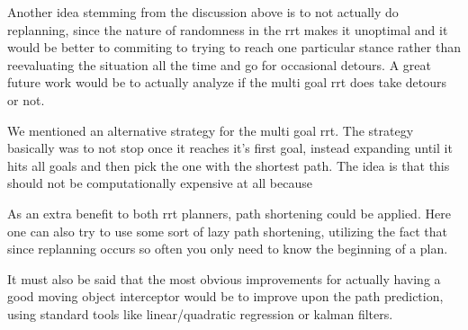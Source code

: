 \documentclass[letterpaper, 10 pt, conference]{ieeeconf}  %
\begin{document}
Another idea stemming from the discussion above is to not actually do
replanning, since the nature of randomness in the rrt makes it unoptimal
and it would be better to commiting to trying to reach one particular
stance rather than reevaluating the situation all the time and go for
occasional detours. A great future work would be to actually analyze if
the multi goal rrt does take detours or not.

We mentioned an alternative strategy for the multi goal rrt.  The strategy
basically was to not stop once it reaches it's first goal, instead
expanding until it hits all goals and then pick the one with the
shortest path. The idea is that this should not be computationally
expensive at all because

As an extra benefit to both rrt planners, path shortening could be
applied. Here one can also try to use some sort of lazy path shortening,
utilizing the fact that since replanning occurs so often you only need
to know the beginning of a plan.

It must also be said that the most obvious improvements for actually
having a good moving object interceptor would be to improve upon the
path prediction, using standard tools like linear/quadratic regression
or kalman filters.



\end{document}
